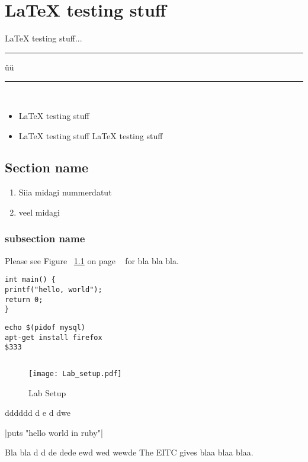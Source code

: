 \chapter{LaTeX testing stuff}
\label{LaTeX testing stuff}
LaTeX testing stuff...
\rule{2.6cm}{0.75pt}  \hspace{3cm} üü \rule{3cm}{0.75pt}\\[2cm]
\begin{itemize}
	\item LaTeX testing stuff
	\item LaTeX testing stuff LaTeX testing stuff
\end{itemize}


\section{Section name}
\begin{enumerate}
	\item Siia midagi nummerdatut
	\item veel midagi
\end{enumerate}
\subsection{subsection name}
Please see Figure ~\ref{Lab Setup} on page ~\pageref{Lab Setup} for bla bla bla.

\begin{verbatim}
int main() {
printf("hello, world");
return 0;
}
\end{verbatim}
\begin{verbatim}
echo $(pidof mysql)
apt-get install firefox
$333
\end{verbatim}
\inputminted{sh}{code/simple.sh}

\begin{figure}
    \centering
	\texttt{[image: Lab\_setup.pdf]}
	\caption{Lab Setup}
	\label{Lab Setup}
\end{figure}


dddddd d  e d dwe \

|puts "hello world in ruby"|\

\cite{website:ssl} Bla bla
\citep{book:code-complete} d  d
\citep{OppeArenduskeskus2010} de dede
\cite{url:pulse} ewd wed
\citep{SecEngineering} wewde
The \gls{EITC} gives blaa blaa blaa.
